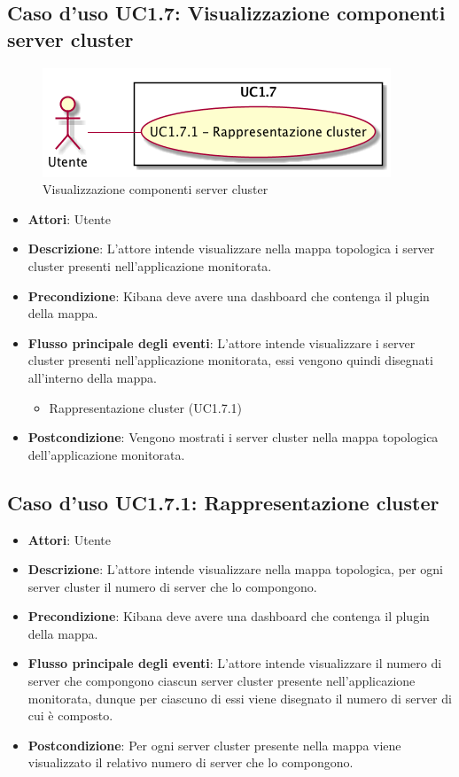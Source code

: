 \subsection{Caso d'uso UC1.7: Visualizzazione componenti server cluster}
\begin{figure} [H]
	\centering
	\includegraphics[scale=0.45]{./UC/UC1-7.png}
	\caption{Visualizzazione componenti server cluster}\label{}
\end{figure}
\begin{itemize}
	\item \textbf{Attori}: Utente
	\item \textbf{Descrizione}: L'attore intende visualizzare nella mappa topologica i server cluster presenti nell'applicazione monitorata.
	\item \textbf{Precondizione}: Kibana deve avere una dashboard che contenga il plugin della mappa.
	\item \textbf{Flusso principale degli eventi}: L'attore intende visualizzare i server cluster presenti nell'applicazione monitorata, essi vengono quindi disegnati all'interno della mappa.
	\begin{itemize}
		\item Rappresentazione cluster (UC1.7.1)
	\end{itemize}
	\item \textbf{Postcondizione}: Vengono mostrati i server cluster nella mappa topologica dell'applicazione monitorata.
\end{itemize}
\subsection{Caso d'uso UC1.7.1: Rappresentazione cluster}
\begin{itemize}
	\item \textbf{Attori}: Utente
	\item \textbf{Descrizione}: L'attore intende visualizzare nella mappa topologica, per ogni server cluster il numero di server che lo compongono.
	\item \textbf{Precondizione}: Kibana deve avere una dashboard che contenga il plugin della mappa.
	\item \textbf{Flusso principale degli eventi}: L'attore intende visualizzare il numero di server che compongono ciascun server cluster presente nell'applicazione monitorata, dunque per ciascuno di essi viene disegnato il numero di server di cui è composto.
	\item \textbf{Postcondizione}: Per ogni server cluster presente nella mappa viene visualizzato il relativo numero di server che lo compongono.
\end{itemize}

